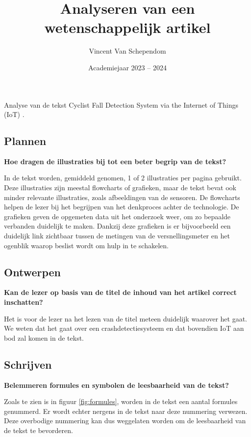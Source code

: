 \documentclass[kulak]{kulakarticle} %
\title{Analyseren van een wetenschappelijk artikel}
\author{Vincent Van Schependom}
\date{Academiejaar 2023 -- 2024}
\begin{document}
\maketitle

\noindent Analyse van de tekst Cyclist Fall Detection System via the Internet of Things (IoT) \cite{KitTamJun2023CFDS}.

\subsection*{Plannen}

\textbf{Hoe dragen de illustraties bij tot een beter begrip van de tekst?}

\noindent In de tekst worden, gemiddeld genomen, 1 of 2 illustraties per pagina gebruikt. Deze illustraties zijn meestal flowcharts of grafieken, maar de tekst bevat ook minder relevante illustraties, zoals afbeeldingen van de sensoren.  De flowcharts helpen de lezer bij het begrijpen van het denkproces achter de technologie. De grafieken geven de opgemeten data uit het onderzoek weer, om zo bepaalde verbanden duidelijk te maken. Dankzij deze grafieken is er bijvoorbeeld een duidelijk link zichtbaar tussen de metingen van de versnellingsmeter en het ogenblik waarop beslist wordt om hulp in te schakelen.

\subsection*{Ontwerpen}

\textbf{Kan de lezer op basis van de titel de inhoud van het artikel correct inschatten?}

\noindent Het is voor de lezer na het lezen van de titel meteen duidelijk waarover het gaat. We weten dat het gaat over een crashdetectiesysteem en dat bovendien IoT aan bod zal komen in de tekst.

\subsection*{Schrijven}

\textbf{Belemmeren formules en symbolen de leesbaarheid van de tekst?}

\noindent Zoals te zien is in figuur \ref{fig:formules}, worden in de tekst een aantal formules genummerd. Er wordt echter nergens in de tekst naar deze nummering verwezen. Deze overbodige nummering kan dus weggelaten worden om de leesbaarheid van de tekst te bevorderen.
\end{document}
